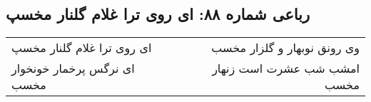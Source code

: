 \begin{center}
\section*{رباعی شماره ۸۸: ای روی ترا غلام گلنار مخسپ}
\label{sec:0088}
\begin{longtable}{l p{0.5cm} r}
ای روی ترا غلام گلنار مخسپ
&&
وی رونق نوبهار و گلزار مخسب
\\
ای نرگس پرخمار خونخوار مخسب
&&
امشب شب عشرت است زنهار مخسب
\\
\end{longtable}
\end{center}
